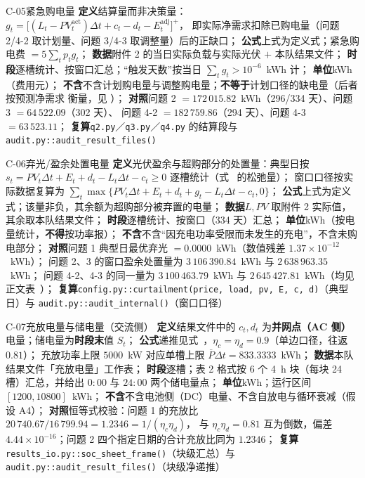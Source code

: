 \begin{caliber}{C-05}{紧急购电量}
\textbf{定义}\quad 结算量而非决策量：
\(g_t=\bigl[(L_t-PV^{\text{act}}_t)\Delta t+c_t-d_t-E^{\text{adj}}_t\bigr]^{+}\)，
即实际净需求扣除已购电量（问题 2/4-2 取计划量、问题 3/4-3 取调整量）后的正缺口；%
\textbf{公式}\quad 上式为定义式；紧急购电费 \(=5\sum_tp_tg_t\)；%
\textbf{数据}\quad 附件 2 的当日实际负载与实际光伏 \(+\) 本队结果文件；%
\textbf{时段}\quad 逐槽统计、按窗口汇总；“触发天数”按当日 \(\sum_tg_t>10^{-6}\)~kWh 计；%
\textbf{单位}\quad kWh（费用元）；%
\textbf{不含}\quad 不含计划购电量与调整购电量；\textbf{不等于}计划口径的缺电量（后者按预测净需求
衡量，见 ）；%
\textbf{对照}\quad 问题 2 \(=172\,015.82\)~kWh（296/334 天）、问题 3 \(=64\,522.09\)（302 天）、
问题 4-2 \(=182\,759.86\)（294 天）、问题 4-3 \(=63\,523.11\)；%
\textbf{复算}\quad \texttt{q2.py}／\texttt{q3.py}／\texttt{q4.py} 的结算段与
\texttt{audit.py::audit\_result\_files()}
\end{caliber}

\begin{caliber}{C-06}{弃光/盈余处置电量}
\textbf{定义}\quad 光伏盈余与超购部分的处置量：典型日按
\(s_t=PV_t\Delta t+E_t+d_t-L_t\Delta t-c_t\ge0\) 逐槽统计（式~ 的松弛量）；
窗口口径按实际数据复算为 \(\sum_t\max\{PV_t\Delta t+E_t+d_t+g_t-L_t\Delta t-c_t,0\}\)；%
\textbf{公式}\quad 上式为定义式；该量非负，其余额为超购部分被弃置的电量；%
\textbf{数据}\quad \(L,PV\) 取附件 2 实际值，其余取本队结果文件；%
\textbf{时段}\quad 逐槽统计、按窗口（334 天）汇总；%
\textbf{单位}\quad kWh（按电量统计，\textbf{不得}按功率报）；%
\textbf{不含}\quad 不含“因充电功率受限而未发生的充电”，不含未购电部分；%
\textbf{对照}\quad 问题 1 典型日最优弃光 \(=0.0000\)~kWh（数值残差 \(1.37\times10^{-12}\)~kWh）；
问题 2、3 的窗口盈余处置量为 \(3\,106\,390.84\)~kWh 与 \(2\,638\,963.35\)~kWh；
问题 4-2、4-3 的同一量为 \(3\,100\,463.79\)~kWh 与 \(2\,645\,427.81\)~kWh（均见正文表~）；%
\textbf{复算}\quad \texttt{config.py::curtailment(price, load, pv, E, c, d)}（典型日）与 \texttt{audit.py::audit\_internal()}（窗口口径）
\end{caliber}

\begin{caliber}{C-07}{充放电量与储电量（交流侧）}
\textbf{定义}\quad 结果文件中的 \(c_t,d_t\) 为\textbf{并网点（AC 侧）}电量；储电量为\textbf{时段末}值 \(S_t\)；%
\textbf{公式}\quad 递推见式~，\(\eta_c=\eta_d=0.9\)（单边口径，往返 \(0.81\)）；
充放功率上限 \(5000\)~kW 对应单槽上限 \(\overline P\Delta t=833.3333\)~kWh；%
\textbf{数据}\quad 本队结果文件「充放电量」工作表；%
\textbf{时段}\quad 逐槽；表 2 格式按 6 个 4~h 块（每块 24 槽）汇总，并给出 \(0{:}00\) 与 \(24{:}00\) 两个储电量点；%
\textbf{单位}\quad kWh；运行区间 \([1200,10800]\)~kWh；%
\textbf{不含}\quad 不含电池侧（DC）电量、不含自放电与循环衰减（假设 A4）；%
\textbf{对照}\quad 恒等式校验：问题 1 的充放比 \(20\,740.67/16\,799.94=1.2346=1/(\eta_c\eta_d)\)，
与 \(\eta_c\eta_d=0.81\) 互为倒数，偏差 \(4.44\times10^{-16}\)；问题 2 四个指定日期的合计充放比同为 \(1.2346\)；%
\textbf{复算}\quad \texttt{results\_io.py::soc\_sheet\_frame()}（块级汇总）与 \texttt{audit.py::audit\_result\_files()}（块级净递推）
\end{caliber}

